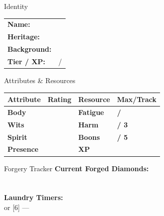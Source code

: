 \documentclass[10pt]{article}
\begin{document}
\begin{minipage}[t]{0.48\linewidth}
    \begin{charbox}{Identity}
        \begin{tabular}{p{2.5cm} p{5cm}}
            \textbf{Name:} & \underline{\hspace{4cm}} \\
            \textbf{Heritage:} & \underline{\hspace{4cm}} \\
            \textbf{Background:} & \underline{\hspace{4cm}} \\
            \textbf{Tier / XP:} & \underline{\hspace{2cm}} / \underline{\hspace{2cm}} \\
        \end{tabular}
    \end{charbox}
    
    \vspace{0.5em}
    
    \begin{charbox}{Attributes \& Resources}
        \begin{tabular}{>{\bfseries}p{2.5cm} >{\bfseries}p{1.5cm} >{\bfseries}p{2.5cm} >{\bfseries}p{1.5cm}}
            \toprule
            \textbf{Attribute} & \textbf{Rating} & \textbf{Resource} & \textbf{Max/Track} \\
            \midrule
            Body & \underline{\hspace{1.5cm}} & Fatigue & \underline{\hspace{1.5cm}} / \underline{\hspace{1.5cm}} \\
            Wits & \underline{\hspace{1.5cm}} & Harm & \underline{\hspace{1.5cm}} / 3 \\
            Spirit & \underline{\hspace{1.5cm}} & Boons & \underline{\hspace{1.5cm}} / 5 \\
            Presence & \underline{\hspace{1.5cm}} & XP & \underline{\hspace{1.5cm}} \\
            \bottomrule
        \end{tabular}
    \end{charbox}
    
    \vspace{0.5em}
    
    \begin{charbox}{Forgery Tracker}
        \textbf{Current Forged Diamonds:}\\
        \underline{\hspace{7cm}}\\
        \underline{\hspace{7cm}}\\
        \textbf{Laundry Timers:}\\
        [4] or [6] --- \underline{\hspace{5cm}}
    \end{charbox}
\end{minipage}
\end{document}
